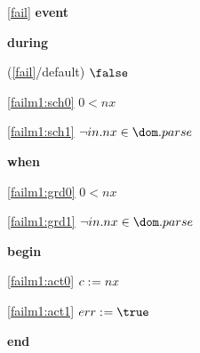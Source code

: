 \noindent \ref{fail}  \textbf{event}
\begin{block}
  \item   \textbf{during}
  \begin{block}
  \item[ (\ref{fail}/default) ]\sout{$\false$} %
  \end{block}
  \begin{block}
  \item[ \eqref{failm1:sch0} ]{$0 < nx$} %
  \item[ \eqref{failm1:sch1} ]{$\neg in.nx \in \dom.parse$} %
  \end{block}
  \item   \textbf{when}
  \begin{block}
  \item[ \eqref{failm1:grd0} ]{$0 < nx$} %
  \item[ \eqref{failm1:grd1} ]{$\neg in.nx \in \dom.parse$} %
  \end{block}
  \item   \textbf{begin}
  \begin{block}
  \item[ \eqref{failm1:act0} ]{$c \mathrel{:\mkern1mu=} nx$} %
  \item[ \eqref{failm1:act1} ]{$err \bcmeq \true$} %
  \end{block}
  \item   \textbf{end} \\
\end{block}
